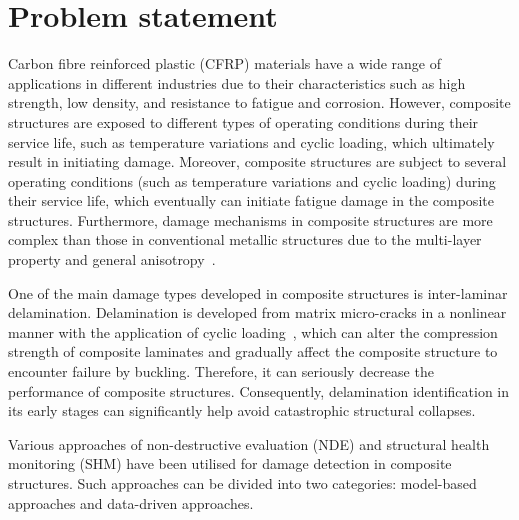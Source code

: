 \section{Problem statement}
\label{sec11}
Carbon fibre reinforced plastic (CFRP) materials have a wide range of applications in different industries due to their characteristics such as high strength, low density, and resistance to fatigue and corrosion.
However, composite structures are exposed to different types of operating conditions during their service life, such as temperature variations and cyclic loading, which ultimately result in initiating damage.
Moreover, composite structures are subject to several operating conditions (such as temperature variations and cyclic loading) during their service life, which eventually can initiate fatigue damage in the composite structures.
Furthermore, damage mechanisms in composite structures are more complex than those in conventional metallic structures due to the multi-layer property and general anisotropy~\cite{Wu2021}. 

One of the main damage types developed in composite structures is inter-laminar delamination.
Delamination is developed from matrix micro-cracks in a nonlinear manner with the application of cyclic loading~\cite{Reifsnider1983, Wu2021}, which can alter the compression strength of composite laminates and gradually affect the composite structure to encount\-er failure by buckling. Therefore, it can seriously decrease the performance of composite structures.
Consequently, delamination identification in its early stages can significantly help avoid catastrophic structural collapses.

Various approaches of non-destructive evaluation (NDE) and structural health monitor\-ing (SHM) have been utilised for damage detection in composite structures.
Such approaches can be divided into two categories: model-based approaches and data-driven approaches.

